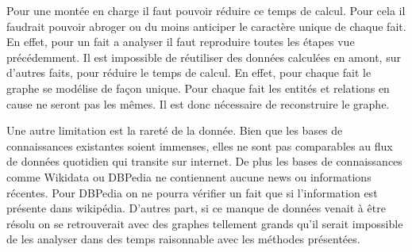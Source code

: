 Pour une montée en charge il faut pouvoir réduire ce temps de calcul. Pour cela il faudrait pouvoir abroger ou du moins anticiper le caractère unique de chaque fait. En effet, pour un fait a analyser il faut reproduire toutes les étapes vue précédemment. Il est impossible de réutiliser des données calculées en amont, sur d'autres faits, pour réduire le temps de calcul. En effet, pour chaque fait le graphe se modélise de façon unique. Pour chaque fait les entités et relations en cause ne seront pas les mêmes. Il est donc nécessaire de reconstruire le graphe.

Une autre limitation est la rareté de la donnée. Bien que les bases de connaissances existantes soient immenses, elles ne sont pas comparables au flux de données quotidien qui transite sur internet. De plus les bases de connaissances comme Wikidata ou DBPedia ne contiennent aucune news ou informations récentes. Pour DBPedia on ne pourra vérifier un fait que si l'information est présente dans wikipédia. D'autres part, si ce manque de données venait à être résolu on se retrouverait avec des graphes tellement grands qu'il serait impossible de les analyser dans des temps raisonnable avec les méthodes présentées.
